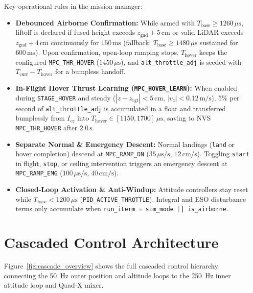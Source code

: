 \documentclass[11pt,a4paper]{article}
\begin{document}
\noindent Key operational rules in the mission manager:
\begin{itemize}
  \item \textbf{Debounced Airborne Confirmation:} While armed with $T_{\text{base}} \ge 1260\,\mu\text{s}$, liftoff is declared if fused height exceeds $z_{\text{gnd}} + 5\,\text{cm}$ or valid LiDAR exceeds $z_{\text{gnd}} + 4\,\text{cm}$ continuously for $150\,\text{ms}$ (fallback: $T_{\text{base}} \ge 1480\,\mu\text{s}$ sustained for $600\,\text{ms}$). Upon confirmation, open-loop ramping stops, $T_{\text{hover}}$ keeps the configured \texttt{MPC\_THR\_HOVER} ($1450\,\mu\text{s}$), and \texttt{alt\_throttle\_adj} is seeded with $T_{\text{curr}} - T_{\text{hover}}$ for a bumpless handoff.
  \item \textbf{In-Flight Hover Thrust Learning (\texttt{MPC\_HOVER\_LEARN}):} When enabled during \texttt{STAGE\_HOVER} and steady ($|z - z_{\text{tgt}}| < 5\,\text{cm}$, $|v_z| < 0.12\,\text{m/s}$), $5\%$ per second of \texttt{alt\_throttle\_adj} is accumulated in a float and transferred bumplessly from $I_{vz}$ into $T_{\text{hover}} \in [1150, 1700]\,\mu\text{s}$, saving to NVS \texttt{MPC\_THR\_HOVER} after $2.0\,\text{s}$.
  \item \textbf{Separate Normal \& Emergency Descent:} Normal landings (\texttt{land} or hover completion) descend at \texttt{MPC\_RAMP\_DN} ($35\,\mu\text{s/s}$, $12\,\text{cm/s}$). Toggling \texttt{start} in flight, \texttt{stop}, or ceiling intervention triggers an emergency descent at \texttt{MPC\_RAMP\_EMG} ($100\,\mu\text{s/s}$, $40\,\text{cm/s}$).
  \item \textbf{Closed-Loop Activation \& Anti-Windup:} Attitude controllers stay reset while $T_{\text{base}} < 1200\,\mu\text{s}$ (\texttt{PID\_ACTIVE\_THROTTLE}). Integral and ESO disturbance terms only accumulate when \texttt{run\_iterm = sim\_mode || is\_airborne}.
\end{itemize}

\section{Cascaded Control Architecture}

Figure~\ref{fig:cascade_overview} shows the full cascaded control hierarchy connecting the 50~Hz outer position and altitude loops to the 250~Hz inner attitude loop and Quad-X mixer.
\end{document}
